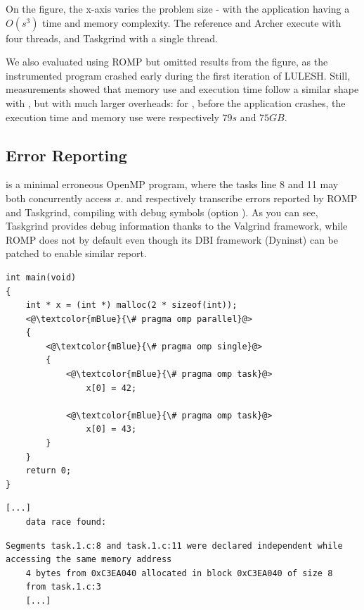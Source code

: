 On the figure, the x-axis varies the problem size  - with the application having a $O(s^3)$ time and memory complexity.
The reference and Archer execute with four threads, and Taskgrind with a single thread.

We also evaluated using ROMP but omitted results from the figure, as the instrumented program crashed early during the first iteration of LULESH.
Still, measurements showed that memory use and execution time follow a similar shape with , but with much larger overheads: for , before the application crashes, the execution time and memory use were respectively $79 s$ and $75GB$.


\subsection{Error Reporting}

 is a minimal erroneous OpenMP program, where the tasks line 8 and 11 may both concurrently access $x$.
 and  respectively transcribe errors reported by ROMP and Taskgrind, compiling with debug symbols (option ).
As you can see, Taskgrind provides debug information thanks to the Valgrind framework, while ROMP does not by default even though its DBI framework (Dyninst) can be patched to enable similar report.

\begin{lstlisting}[style=CStyle, captionpos=b, caption={task.c - an errorneous OpenMP Program}, label={lst:error-report}]
int main(void)
{
	int * x = (int *) malloc(2 * sizeof(int));
	<@\textcolor{mBlue}{\# pragma omp parallel}@>
	{
		<@\textcolor{mBlue}{\# pragma omp single}@>
		{
			<@\textcolor{mBlue}{\# pragma omp task}@>
				x[0] = 42;
			
			<@\textcolor{mBlue}{\# pragma omp task}@>
				x[0] = 43;
		}
	}
	return 0;
}
\end{lstlisting}

\begin{lstlisting}[style=text, captionpos=b, caption={An error report from ROMP}, label={lst:error-report-romp}]
	[...]
	data race found:
\end{lstlisting}

\begin{lstlisting}[style=text, captionpos=b, caption={An error report from Taskgrind}, label={lst:error-report-taskgrind}]
	Segments task.1.c:8 and task.1.c:11 were declared independent while accessing the same memory address
	4 bytes from 0xC3EA040 allocated in block 0xC3EA040 of size 8
	from task.1.c:3
	[...]
\end{lstlisting}



